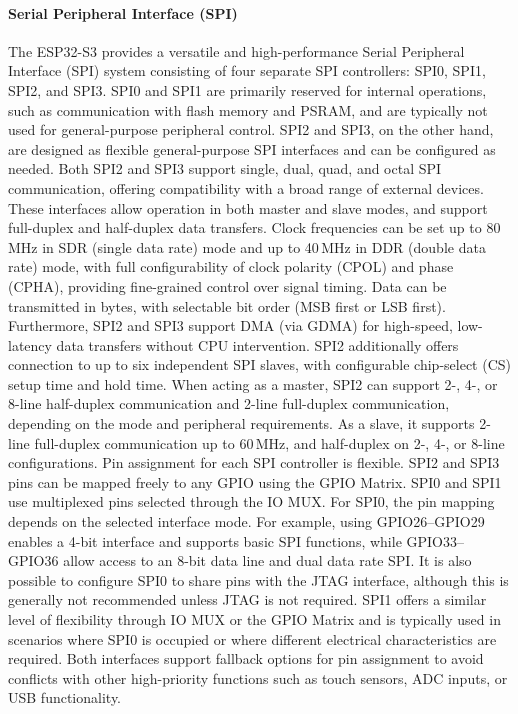 \paragraph{Serial Peripheral Interface (SPI)}
The ESP32-S3 provides a versatile and high-performance Serial Peripheral Interface (SPI) system consisting of four separate SPI controllers: SPI0, SPI1, SPI2, and SPI3. SPI0 and SPI1 are primarily reserved for internal operations, such as communication with flash memory and PSRAM, and are typically not used for general-purpose peripheral control. SPI2 and SPI3, on the other hand, are designed as flexible general-purpose SPI interfaces and can be configured as needed. Both SPI2 and SPI3 support single, dual, quad, and octal SPI communication, offering compatibility with a broad range of external devices. These interfaces allow operation in both master and slave modes, and support full-duplex and half-duplex data transfers. Clock frequencies can be set up to 80\,MHz in SDR (single data rate) mode and up to 40\,MHz in DDR (double data rate) mode, with full configurability of clock polarity (CPOL) and phase (CPHA), providing fine-grained control over signal timing. Data can be transmitted in bytes, with selectable bit order (MSB first or LSB first). Furthermore, SPI2 and SPI3 support DMA (via GDMA) for high-speed, low-latency data transfers without CPU intervention. SPI2 additionally offers connection to up to six independent SPI slaves, with configurable chip-select (CS) setup time and hold time. When acting as a master, SPI2 can support 2-, 4-, or 8-line half-duplex communication and 2-line full-duplex communication, depending on the mode and peripheral requirements. As a slave, it supports 2-line full-duplex communication up to 60\,MHz, and half-duplex on 2-, 4-, or 8-line configurations.
Pin assignment for each SPI controller is flexible. SPI2 and SPI3 pins can be mapped freely to any GPIO using the GPIO Matrix. SPI0 and SPI1 use multiplexed pins selected through the IO MUX. For SPI0, the pin mapping depends on the selected interface mode. For example, using GPIO26–GPIO29 enables a 4-bit interface and supports basic SPI functions, while GPIO33–GPIO36 allow access to an 8-bit data line and dual data rate SPI. It is also possible to configure SPI0 to share pins with the JTAG interface, although this is generally not recommended unless JTAG is not required. SPI1 offers a similar level of flexibility through IO MUX or the GPIO Matrix and is typically used in scenarios where SPI0 is occupied or where different electrical characteristics are required. Both interfaces support fallback options for pin assignment to avoid conflicts with other high-priority functions such as touch sensors, ADC inputs, or USB functionality.

